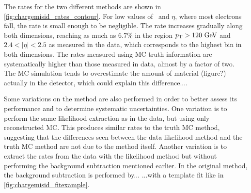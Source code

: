 The rates for the two different methods are 
shown in \fig\ref{fig:chargemisid_rates_contour}.
For low values of \pt~and $\eta$, where most electrons fall, 
the rate is small enough to be negligible. 
The rate increases gradually along both dimensions, reaching as much as
6.7\% in the region $\pt > 120\GeV$ and $2.4 < |\eta| < 2.5$ as measured
in the data, which corresponds to the highest bin in both dimensions. 
The rates measured using MC truth information are systematically higher
than those measured in data, almost by a factor of two. The MC simulation
tends to overestimate the amount of material (figure?) actually in the
detector, which could explain this difference....





Some variations on the method are also performed
in order to better assess its performance 
and to determine systematic uncertainties.
One variation is to perform the same likelihood extraction
as in the data, but using only reconstructed MC. This produces
similar rates to the truth MC method, suggesting that the differences
seen between the data likelihood method and the truth MC method
are not due to the method itself. 
Another variation is to extract the rates from the data with the 
likelihood method but without performing the background
subtraction mentioned earlier. In the original method, 
the background subtraction is performed by... 
...with a template fit like in \fig\ref{fig:chargemisid_fitexample}.

